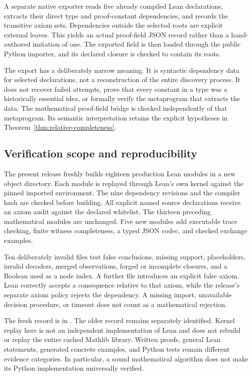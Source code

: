 \documentclass[11pt,oneside]{article}
\theoremstyle{komorebiplain}
\theoremstyle{komorebidefinition}
\theoremstyle{komorebiremark}
\begin{document}
A separate native exporter reads five already compiled Lean declarations, extracts their direct type and proof-constant dependencies, and records the transitive axiom sets. Dependencies outside the selected roots are explicit external leaves. This yields an actual proof-field JSON record rather than a hand-authored imitation of one. The exported field is then loaded through the public Python importer, and its declared closure is checked to contain its roots.

The export has a deliberately narrow meaning. It is syntactic dependency data for selected declarations, not a reconstruction of the entire discovery process. It does not recover failed attempts, prove that every constant in a type was a historically essential idea, or formally verify the metaprogram that extracts the data. The mathematical proof-field bridge is checked independently of that metaprogram. Its semantic interpretation retains the explicit hypotheses in Theorem~\ref{thm:relative-completeness}.

\subsection{Verification scope and reproducibility}

The present release freshly builds eighteen production Lean modules in a new object directory. Each module is replayed through Lean's own kernel against the pinned imported environment. The nine dependency revisions and the compiler hash are checked before building. All explicit named source declarations receive an axiom audit against the declared whitelist. The thirteen preceding mathematical modules are unchanged. Five new modules add executable trace checking, finite witness completeness, a typed JSON codec, and checked exchange examples.

Ten deliberately invalid files test false conclusions, missing support, placeholders, invalid decoders, merged observations, forged or incomplete closures, and a Boolean used as a node index. A further file introduces an explicit false axiom. Lean correctly accepts a consequence relative to that axiom, while the release's separate axiom policy rejects the dependency. A missing import, unavailable decision procedure, or timeout does not count as a mathematical rejection.

The fresh record is in . The older record remains separately identified. Kernel replay here is not an independent implementation of Lean and does not rebuild or replay the entire cached Mathlib library. Written proofs, general Lean statements, generated concrete examples, and Python tests remain different evidence categories. In particular, a sound mathematical algorithm does not make its Python implementation universally verified.
\end{document}
